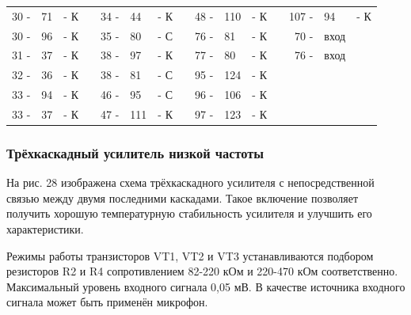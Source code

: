 \documentclass[12pt]{article}
\begin{document}
\hrulefill

\begin{tabular}{r l r p{0.5cm} r l r p{0.5cm} r l r p{0.5cm} r l r}
30 - & 71  & - К &   & 34 - & 44 & - К &    &  48 - & 110 & - К &   & 107 - & 94   & - К \\
30 - & 96  & - К &   & 35 - & 80 & - С &    &  76 - &  81 & - К &   &  70 - & вход &     \\
31 - & 37  & - К &   & 38 - & 97 & - К &    &  77 - &  80 & - К &   &  76 - & вход &     \\
32 - & 36  & - К &   & 38 - & 81 & - С &    &  95 - & 124 & - К &   &       &      &     \\
33 - & 94  & - К &   & 46 - & 95 & - С &    &  96 - & 106 & - К &   &       &      &     \\
33 - & 37  & - К &   & 47 - &111 & - К &    &  97 - & 123 & - К &   &       &      &     \\
\end{tabular}

\hrulefill

\vspace*{10em}

\subsubsection{Трёхкаскадный усилитель низкой частоты}

На рис. 28 изображена схема трёхкаскадного усилителя с непосредственной связью между двумя последними каскадами. Такое включение позволяет получить хорошую температурную стабильность усилителя и улучшить его характеристики.

Режимы работы транзисторов VT1, VT2 и VT3 устанавливаются подбором резисторов R2 и R4 сопротивлением 82-220 кОм и 220-470 кОм соответственно. Максимальный уровень входного сигнала 0,05 мВ. В качестве источника входного сигнала может быть применён микрофон.
\newpage
\end{document}

